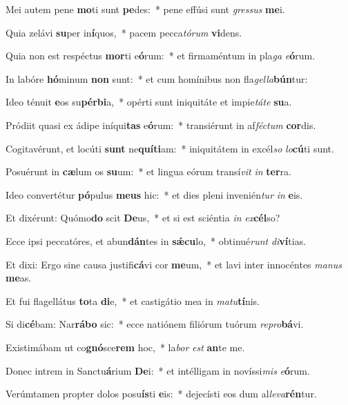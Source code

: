 \item Mei autem pene \textbf{mo}ti sunt \textbf{pe}des:~* pene effúsi sunt \textit{gres}\textit{sus} \textbf{me}i.
\item Quia zelávi \textbf{su}per in\textbf{í}quos,~* pacem pecca\textit{tó}\textit{rum} \textbf{vi}dens.
\item Quia non est respéctus \textbf{mor}ti e\textbf{ó}rum:~* et firmaméntum in pla\textit{ga} \textit{e}\textbf{ó}rum.
\item In labóre \textbf{hó}minum \textbf{non} sunt:~* et cum homínibus non fla\textit{gel}\textit{la}\textbf{bún}tur:
\item Ideo ténuit \textbf{e}os su\textbf{pér}\textbf{bi}a,~* opérti sunt iniquitáte et impie\textit{tá}\textit{te} \textbf{su}a.
\item Pródiit quasi ex ádipe iníqui\textbf{tas} e\textbf{ó}rum:~* transiérunt in af\textit{féc}\textit{tum} \textbf{cor}dis.
\item Cogitavérunt, et locúti \textbf{sunt} ne\textbf{quí}\textbf{ti}am:~* iniquitátem in excél\textit{so} \textit{lo}\textbf{cú}ti sunt.
\item Posuérunt in \textbf{cæ}lum os \textbf{su}um:~* et lingua eórum transí\textit{vit} \textit{in} \textbf{ter}ra.
\item Ideo convertétur \textbf{pó}pulus \textbf{me}\textbf{us} hic:~* et dies pleni invenién\textit{tur} \textit{in} \textbf{e}is.
\item Et dixérunt: Quómo\textbf{do} scit \textbf{De}us,~* et si est sciéntia \textit{in} \textit{ex}\textbf{cél}so?
\item Ecce ipsi peccatóres, et abun\textbf{dán}tes in \textbf{sǽ}\textbf{cu}lo,~* obtinué\textit{runt} \textit{di}\textbf{ví}tias.
\item Et dixi: Ergo sine causa justifi\textbf{cá}vi cor \textbf{me}um,~* et lavi inter innocéntes \textit{ma}\textit{nus} \textbf{me}as.
\item Et fui flagellátus \textbf{to}ta \textbf{di}e,~* et castigátio mea in \textit{ma}\textit{tu}\textbf{tí}nis.
\item Si di\textbf{cé}bam: Nar\textbf{rá}\textbf{bo} sic:~* ecce natiónem filiórum tuórum \textit{re}\textit{pro}\textbf{bá}vi.
\item Existimábam ut co\textbf{gnó}sce\textbf{rem} hoc,~* la\textit{bor} \textit{est} \textbf{an}te me.
\item Donec intrem in Sanctu\textbf{á}rium \textbf{De}i:~* et intélligam in novíssi\textit{mis} \textit{e}\textbf{ó}rum.
\item Verúmtamen propter dolos posu\textbf{ís}ti \textbf{e}is:~* dejecísti eos dum al\textit{le}\textit{va}\textbf{rén}tur.
